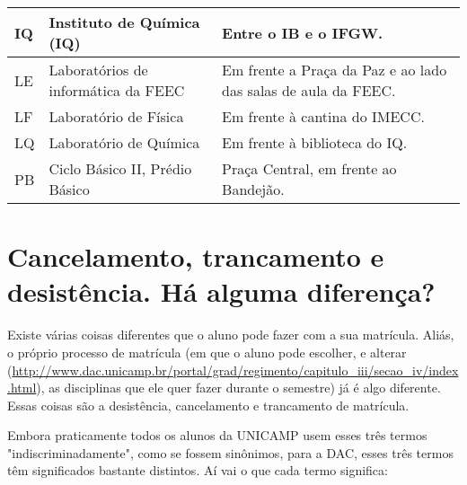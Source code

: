 \documentclass[a4paper,10pt]{article}
\begin{document}
\begin{tabularx}{\linewidth}{|Y|Y|Y|}
 IQ  &  Instituto de Química (IQ)  &  Entre o IB e o IFGW.\tabularnewline \hline

 LE  &  Laboratórios de informática da FEEC  &  Em frente a Praça da Paz e ao lado das salas de aula da FEEC.\tabularnewline \hline

 LF  &  Laboratório de Física  &  Em frente à cantina do IMECC.\tabularnewline \hline

 LQ  &  Laboratório de Química  &  Em frente à biblioteca do IQ.\tabularnewline \hline

 PB  &  Ciclo Básico II, Prédio Básico  &  Praça Central, em frente ao Bandejão.\tabularnewline \hline

\end{tabularx}

\section{Cancelamento, trancamento e desistência. Há alguma diferença?}
Existe várias coisas diferentes que o aluno pode fazer com a sua matrícula.
Aliás, o próprio processo de matrícula (em que o aluno pode escolher, e alterar
(\url{http://www.dac.unicamp.br/portal/grad/regimento/capitulo_iii/secao_iv/index.html}),
as disciplinas que ele quer fazer durante o semestre) já é algo diferente. Essas
coisas são a desistência, cancelamento e trancamento de matrícula.

Embora praticamente todos os alunos da UNICAMP usem esses três termos
"indiscriminadamente", como se fossem sinônimos, para a DAC, esses três termos
têm significados bastante distintos. Aí vai o que cada termo significa:
\end{document}
